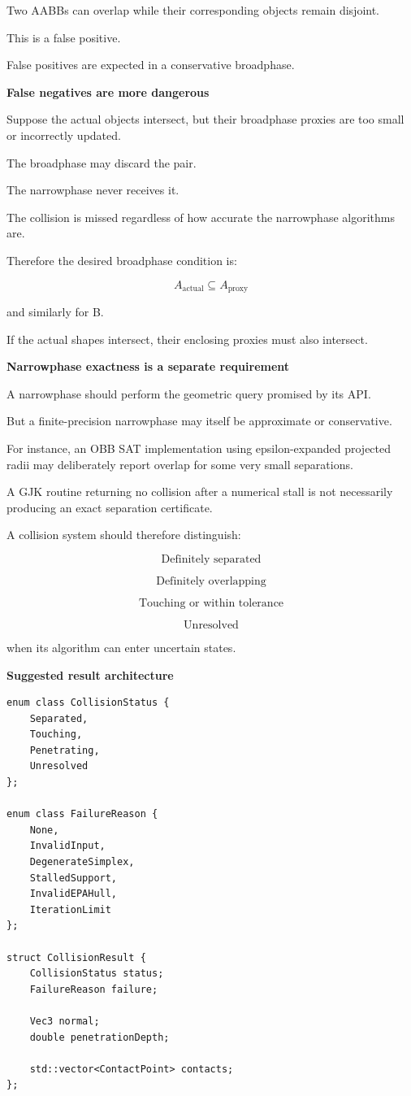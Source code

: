 Two AABBs can overlap while their corresponding objects remain disjoint.

This is a false positive.

False positives are expected in a conservative broadphase.

\textbf{False negatives are more dangerous}

Suppose the actual objects intersect, but their broadphase proxies are too small or incorrectly updated.

The broadphase may discard the pair.

The narrowphase never receives it.

The collision is missed regardless of how accurate the narrowphase algorithms are.

Therefore the desired broadphase condition is:

\[
\boxed{ A_{\mathrm{actual}}\subseteq A_{\mathrm{proxy}} }
\]

and similarly for B.

If the actual shapes intersect, their enclosing proxies must also intersect.

\textbf{Narrowphase exactness is a separate requirement}

A narrowphase should perform the geometric query promised by its API.

But a finite-precision narrowphase may itself be approximate or conservative.

For instance, an OBB SAT implementation using epsilon-expanded projected radii may deliberately report overlap for some very small separations.

A GJK routine returning no collision after a numerical stall is not necessarily producing an exact separation certificate.

A collision system should therefore distinguish:

\[
\text{Definitely separated}
\]

\[
\text{Definitely overlapping}
\]

\[
\text{Touching or within tolerance}
\]

\[
\text{Unresolved}
\]

when its algorithm can enter uncertain states.

\textbf{Suggested result architecture}

\begin{verbatim}
enum class CollisionStatus {
    Separated,
    Touching,
    Penetrating,
    Unresolved
};

enum class FailureReason {
    None,
    InvalidInput,
    DegenerateSimplex,
    StalledSupport,
    InvalidEPAHull,
    IterationLimit
};

struct CollisionResult {
    CollisionStatus status;
    FailureReason failure;

    Vec3 normal;
    double penetrationDepth;

    std::vector<ContactPoint> contacts;
};
\end{verbatim}

